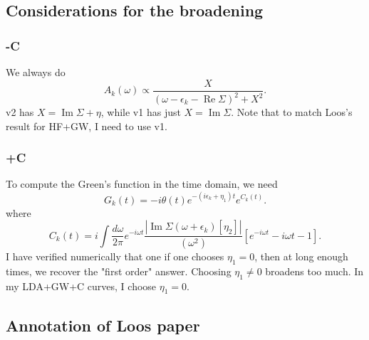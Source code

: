 \subsection{Considerations for the broadening}
\subsubsection{-C}
We always do 
\begin{equation}
    A_k(\omega ) \propto \frac{X}{(\omega - \epsilon_k - \operatorname{Re}\Sigma)^2 + X^2}.
\end{equation}
v2 has $X = \operatorname{Im}\Sigma+\eta$, while v1 has just $X = \operatorname{Im}\Sigma$. Note that to match Loos's result for HF+GW, I need to use v1.
\subsubsection{+C}
To compute the Green's function in the time domain, we need 
\begin{equation}
    G_k(t) = -i \theta(t) e^{-(i \epsilon_k +\eta_1)t} e^{C_k(t)}.
\end{equation}
where
\begin{equation}
    C_k(t) = i \int \frac{d\omega}{2\pi} e^{-i \omega t} \frac{|\operatorname{Im}\Sigma(\omega+\epsilon_k)[\eta_2]|}{(\omega^2)} \left[ e^{-i \omega t} - i \omega t - 1 \right].
\end{equation}
I have verified numerically that one if one chooses $\eta_1 = 0$, then at long enough times, we recover the "first order" answer. Choosing $\eta_1 \neq 0$ broadens too much. In my LDA+GW+C curves, I choose $\eta_1 = 0$.
\subsection{Annotation of Loos paper}

